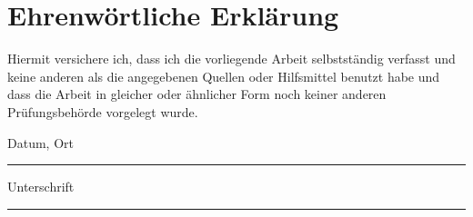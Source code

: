 \chapter*{Ehrenwörtliche Erklärung}
Hiermit versichere ich, dass ich die vorliegende Arbeit selbstständig verfasst und keine anderen als die angegebenen Quellen oder Hilfsmittel benutzt habe und dass die Arbeit in gleicher oder ähnlicher Form noch keiner anderen Prüfungsbehörde vorgelegt wurde.

\vspace{20mm}

Datum, Ort \rule{5cm}{0.4pt}\hspace{1cm}Unterschrift \rule{5cm}{0.4pt}\\
{\small \textit{\myAutor}}

